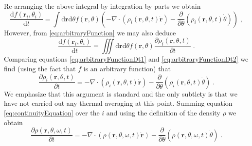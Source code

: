 \documentclass{article}
\begin{document}
Re-arranging the above integral by integration by parts we obtain
\begin{equation}
    \label{eq:arbitraryFunctionDt1}
    \frac{\mathrm{d}f\left( \mathbf{r}_i,\theta _i \right)}{\mathrm{d}t}=\int{\mathrm{d}\mathbf{r}\mathrm{d}\theta f\left( \mathbf{r},\theta \right) \left( -\nabla \cdot \left( \rho _i\left( \mathbf{r},\theta ,t \right) \dot{\mathbf{r}} \right) -\frac{\partial}{\partial \theta}\left( \rho _i\left( \mathbf{r},\theta ,t \right) \dot{\theta} \right) \right)}\;,
\end{equation}
However, from \eqref{eq:arbitraryFunction} we may also deduce
\begin{equation}
    \label{eq:arbitraryFunctionDt2}
    \frac{\mathrm{d}f\left( \mathbf{r}_i,\theta _i \right)}{\mathrm{d}t}=\iiint{\mathrm{d}\mathbf{r}\mathrm{d}\theta f\left( \mathbf{r},\theta \right) \frac{\partial \rho _i\left( \mathbf{r},\theta ,t \right)}{\partial t}}\;.
\end{equation}
Comparing equations \eqref{eq:arbitraryFunctionDt1} and \eqref{eq:arbitraryFunctionDt2} we find (using the fact that $f$ is an arbitrary function) that
\begin{equation}
    \label{eq:continuityEquation}
    \frac{\partial \rho _i\left( \mathbf{r},\theta ,t \right)}{\partial t}=-\nabla \cdot \left( \rho _i\left( \mathbf{r},\theta ,t \right) \dot{\mathbf{r}} \right) -\frac{\partial}{\partial \theta}\left( \rho _i\left( \mathbf{r},\theta ,t \right) \dot{\theta} \right) \;.
\end{equation}
We emphasize that this argument is standard and the only subtlety is that we have not carried out any thermal averaging at this point. Summing equation \eqref{eq:continuityEquation} over the $i$ and using the definition of the density $\rho$ we obtain
\begin{equation}
    \frac{\partial \rho \left( \mathbf{r},\theta ,\omega ,t \right)}{\partial t}=-\nabla \cdot \left( \rho \left( \mathbf{r},\theta ,\omega ,t \right) \mathbf{\dot{r}} \right) -\frac{\partial}{\partial \theta}\left( \rho \left( \mathbf{r},\theta ,\omega ,t \right) \dot{\theta} \right)\;.
\end{equation}
\end{document}

